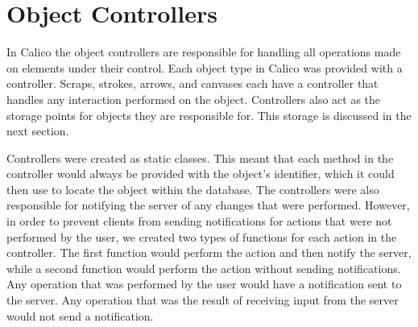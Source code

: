 \section{Object Controllers}
In Calico the object controllers are responsible for handling all operations made on elements under their control. Each object type in Calico was provided with a controller.
Scraps, strokes, arrows, and canvases each have a controller that handles any interaction performed on the object. 
Controllers also act as the storage points for objects they are responsible for. This storage is discussed in the next section.

Controllers were created as static classes. This meant that each method in the controller would always be provided with the object's identifier, which it could then use to locate the object within the database. 
The controllers were also responsible for notifying the server of any changes that were performed. However, in order to prevent clients from sending notifications for actions that were not performed by the user, we created two types of functions for each action in the controller. The first function would perform the action and then notify the server, while a second function would perform the action without sending notifications. Any operation that was performed by the user would have a notification sent to the server. Any operation that was the result of receiving input from the server would not send a notification.